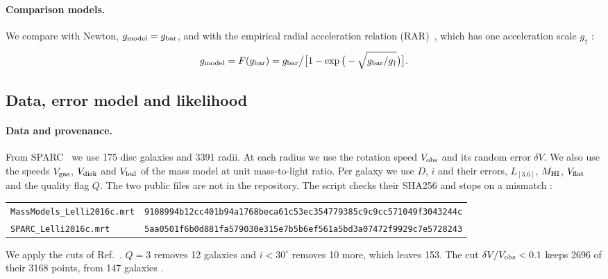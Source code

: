\paragraph{Comparison models.} We compare with Newton, $g_{\rm model}=g_{\rm bar}$, and with the empirical radial acceleration
relation (RAR)~\cite{mcgaugh2016}, which has one acceleration scale $g_\dagger$ \tagP:
\begin{equation}\label{eq:sparc-rar}
g_{\rm model}=F(g_{\rm bar})=g_{\rm bar}\big/\big[1-\exp\big(-\sqrt{g_{\rm bar}/g_\dagger}\big)\big].
\end{equation}

\subsection{Data, error model and likelihood}\label{sec:sparc-data}

\paragraph{Data and provenance.} From SPARC~\cite{lelli2016} we use 175 disc galaxies and 3391 radii. At each radius we use the
rotation speed $V_{\rm obs}$ and its random error $\delta V$. We also use the speeds $V_{\rm gas}$, $V_{\rm disk}$ and $V_{\rm bul}$ of
the mass model at unit mass-to-light ratio. Per galaxy we use $D$, $i$ and their errors, $L_{[3.6]}$, $M_{\rm HI}$, $V_{\rm flat}$ and the
quality flag $Q$. The two public files are not in the repository. The script checks their SHA256 and stops on a mismatch
:
\begin{center}\footnotesize
\begin{tabular}{@{}ll@{}}
\texttt{MassModels\_Lelli2016c.mrt} & \texttt{9108994b12cc401b94a1768beca61c53ec354779385c9c9cc571049f3043244c}\\
\texttt{SPARC\_Lelli2016c.mrt} & \texttt{5aa0501f6b0d881fa579030e315e7b5b6ef561a5bd3a07472f9929c7e5728243}
\end{tabular}
\end{center}
We apply the cuts of Ref.~\cite{mcgaugh2016}. $Q=3$ removes 12 galaxies and $i<30^\circ$ removes 10 more, which leaves 153. The cut
$\delta V/V_{\rm obs}<0.1$ keeps 2696 of their 3168 points, from 147 galaxies .

